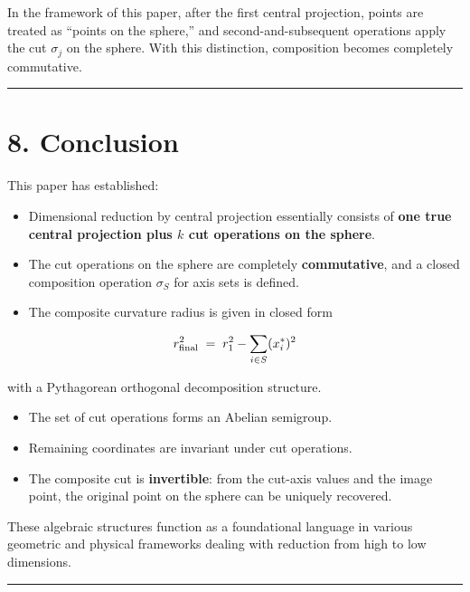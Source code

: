 \documentclass[a4paper,11pt]{article}
\theoremstyle{definition}
\theoremstyle{remark}
\providecommand{\tightlist}{%
  \setlength{\itemsep}{0pt}\setlength{\parskip}{0pt}}
\begin{document}
In the framework of this paper, after the first central projection,
points are treated as ``points on the sphere,'' and
second-and-subsequent operations apply the cut \(\sigma_j\) on the
sphere. With this distinction, composition becomes completely
commutative.

\begin{center}\rule{0.5\linewidth}{0.5pt}\end{center}

\section{8. Conclusion}\label{conclusion}

This paper has established:

\begin{itemize}
\tightlist
\item
  Dimensional reduction by central projection essentially consists of
  \textbf{one true central projection plus \(k\) cut operations on the
  sphere}.
\item
  The cut operations on the sphere are completely \textbf{commutative},
  and a closed composition operation \(\sigma_S\) for axis sets is
  defined.
\item
  The composite curvature radius is given in closed form
\end{itemize}

\[
r_{\rm final}^{2} \;=\; r_{1}^{2} - \sum_{i \in S}(x_i^{*})^{2}
\]

with a Pythagorean orthogonal decomposition structure.

\begin{itemize}
\tightlist
\item
  The set of cut operations forms an Abelian semigroup.
\item
  Remaining coordinates are invariant under cut operations.
\item
  The composite cut is \textbf{invertible}: from the cut-axis values and
  the image point, the original point on the sphere can be uniquely
  recovered.
\end{itemize}

These algebraic structures function as a foundational language in
various geometric and physical frameworks dealing with reduction from
high to low dimensions.

\begin{center}\rule{0.5\linewidth}{0.5pt}\end{center}
\end{document}
